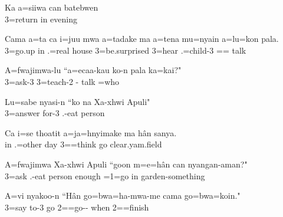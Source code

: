 \ea
\gll Ka a=siiwa can batebwen\\  3=return in evening\\ \glt {}
\z

\ea
\gll Cama a=ta ca i=juu mwa a=tadake ma a=tena mu=nyain a=lu=kon pala.\\  3=go.up in .=real house 3=be.surprised  3=hear .=child-3 == talk\\ \glt  {}
\z

\ea
\gll A=fwajimwa-lu ``a=ecaa-kau ko-n pala ka=kai?"\\ 3=ask-3 3=teach-2 - talk =who\\ \glt {}
\z

\ea
\gll Lu=sabe nyasi-n ``ko na Xa-xhwi Apuli"\\ 3=answer for-3   .-eat person\\ \glt {}
\z

\ea
\gll Ca i=se thoatit a=ja=hnyimake ma hân sanya.\\ in .=other day 3==think  go clear.yam.field\\ \glt {}
\z

\ea
\gll A=fwajimwa Xa-xhwi Apuli ``goon m=e=hân can nyangan-aman?"\\ 3=ask .-eat person enough =1=go in garden-something\\ \glt {} 
\z

\ea
\gll A=vi nyakoo-n ``Hân go=bwa=ha-mwa-me cama go=bwa=koin."\\ 3=say to-3 go 2==go-- when 2==finish\\ \glt {}
\z

